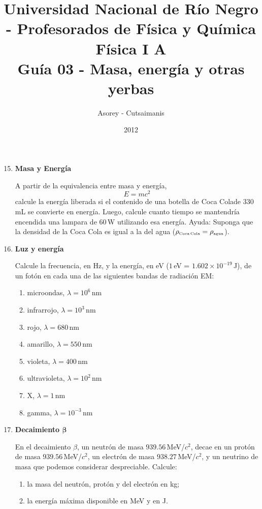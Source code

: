 \documentclass[a4paper,12pt]{article}
\begin{document}
\title{
{\normalsize{Universidad Nacional de Río Negro - Profesorados de Física y Química}}\\
Física I A \\ Guía 03 - Masa, energía y otras yerbas}
\author{Asorey - Cutsaimanis}
\date{2012}
\maketitle

\begin{enumerate}
\setcounter{enumi}{14}      %

\item {\bf{Masa y Energía}}

A partir de la equivalencia entre masa y energía, 
\begin{equation}
E = m c^2
\end{equation} 
calcule la energía liberada si el contenido de una botella de Coca
Cola\texttrademark de $330$\,mL se convierte en energía. Luego, calcule cuanto
tiempo se mantendría encendida una lampara de $60$\,W utilizando esa energía.
Ayuda: Suponga que la densidad de la Coca Cola es igual a la del agua
($\rho_{\textrm{\tiny{Coca\,Cola}}}={\rho_{\textrm{\tiny{agua}}}}$).

\item {\bf{Luz y energía}}

Calcule la frecuencia, en Hz, y la energía, en eV ($1$\,eV =
$1.602\times10^{-19}$\,J), de un fotón en cada una de las siguientes bandas de
radiación EM:
\begin{enumerate}
\item microondas, $\lambda=10^6$\,nm
\item infrarrojo, $\lambda=10^3$\,nm
\item rojo, $\lambda=680$\,nm
\item amarillo, $\lambda=550$\,nm
\item violeta, $\lambda=400$\,nm
\item ultravioleta, $\lambda=10^2$\,nm
\item X, $\lambda=1$\,nm
\item gamma, $\lambda=10^{-3}$\,nm
\end{enumerate}

\item {\bf{Decaimiento $\mathbf{\beta}$}}

En el decaimiento $\beta$, un neutrón de masa $939.56$\,MeV/$c^2$, decae en un
protón de masa $939.56$\,MeV/$c^2$, un electrón de masa $938.27$\,MeV/$c^2$, y
un neutrino de masa que podemos considerar despreciable. Calcule:
\begin{enumerate}
\item la masa del neutrón, protón y del electrón en kg;
\item la energía máxima disponible en MeV y en J.
\end{enumerate}


\end{enumerate}
\end{document}
